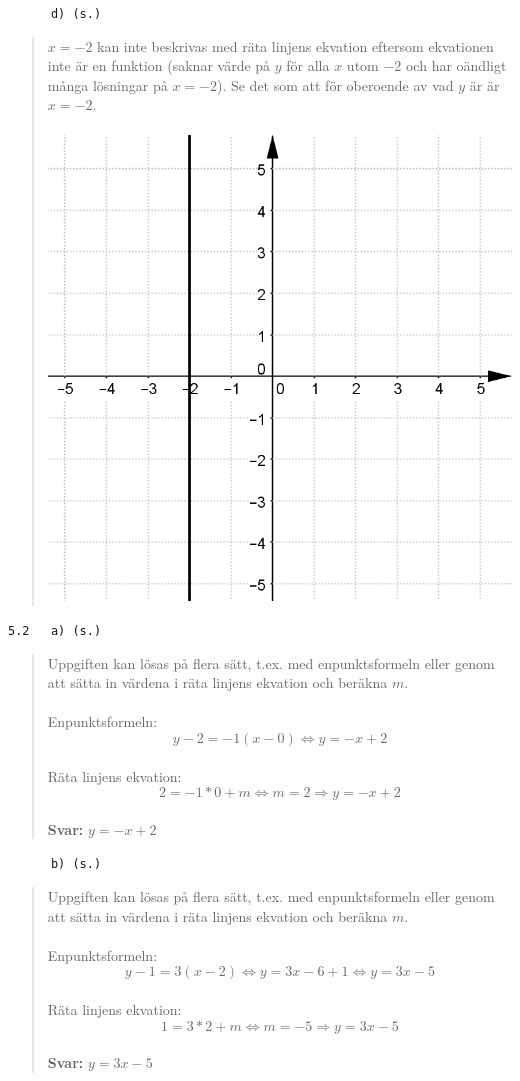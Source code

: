 \documentclass[a4paper]{article}
\newcommand{\tskcol}[1]{\textcolor{tskcol}{#1}}
\begin{document}
	\pagebreak
	
	\texttt{\tskcol{~~~~~~d) (s.)}}
	\begin{quotation}
		\noindent
		$x=-2$ kan inte beskrivas med räta linjens ekvation eftersom ekvationen inte är en funktion (saknar värde på $y$ för alla $x$ utom $-2$ och har oändligt många lösningar på $x=-2$). Se det som att för oberoende av vad $y$ är är $x=-2$.  \\ \\
		\includegraphics[scale=0.2]{images/51d.png}
	\end{quotation}
	
	\texttt{\tskcol{5.2~~~a) (s.)}}
	\begin{quotation}
		\noindent
		Uppgiften kan lösas på flera sätt, t.ex. med enpunktsformeln eller genom att sätta in värdena i räta linjens ekvation och beräkna $m$.
		\\ \\
		Enpunktsformeln: 
		\[y-2=-1(x-0) \Leftrightarrow 
		y=-x+2\]
		\\
		Räta linjens ekvation:
		\[2=-1*0+m \Leftrightarrow
		m=2\Rightarrow
		y=-x+2\]
		\\
		\textbf{Svar:} $y=-x+2$
	\end{quotation}
	
	\texttt{\tskcol{~~~~~~b) (s.)}}
	\begin{quotation}
		\noindent
		Uppgiften kan lösas på flera sätt, t.ex. med enpunktsformeln eller genom att sätta in värdena i räta linjens ekvation och beräkna $m$.
		\\ \\
		Enpunktsformeln: 
		\[y-1=3(x-2) \Leftrightarrow 
		y=3x-6+1 \Leftrightarrow
		y=3x-5\]
		\\
		Räta linjens ekvation:
		\[1=3*2+m \Leftrightarrow
		m=-5\Rightarrow
		y=3x-5\]
		\\
		\textbf{Svar:} $y=3x-5$
	\end{quotation}
	
\end{document}
